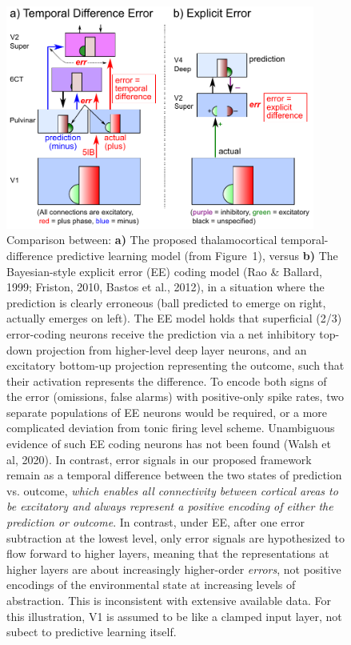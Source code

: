 \documentclass[11pt,twoside]{article}
\newif\myifpdf
\begin{document}
\begin{figure}
  \centering\includegraphics[width=4in]{fig_02} %
  \caption{Comparison between: {\bf a)} The proposed thalamocortical temporal-difference predictive learning model (from Figure~1), versus {\bf b)} The Bayesian-style explicit error (EE) coding model (Rao \& Ballard, 1999; Friston, 2010, Bastos et al., 2012), in a situation where the prediction is clearly erroneous (ball predicted to emerge on right, actually emerges on left).  The EE model holds that superficial (2/3) error-coding neurons receive the prediction via a net inhibitory top-down projection from higher-level deep layer neurons, and an excitatory bottom-up projection representing the outcome, such that their activation represents the difference.  To encode both signs of the error (omissions, false alarms) with positive-only spike rates, two separate populations of EE neurons would be required, or a more complicated deviation from tonic firing level scheme.  Unambiguous evidence of such EE coding neurons has not been found (Walsh et al, 2020).  In contrast, error signals in our proposed framework remain as a temporal difference between the two states of prediction vs. outcome, \emph{which enables all connectivity between cortical areas to be excitatory and always represent a positive encoding of either the prediction or outcome}.  In contrast, under EE, after one error subtraction at the lowest level, only error signals are hypothesized to flow forward to higher layers, meaning that the representations at higher layers are about increasingly higher-order \emph{errors}, not positive encodings of the environmental state at increasing levels of abstraction.  This is inconsistent with extensive available data.  For this illustration, V1 is assumed to be like a clamped input layer, not subect to predictive learning itself.}
  \label{fig.ee}
\end{figure}
\end{document}
